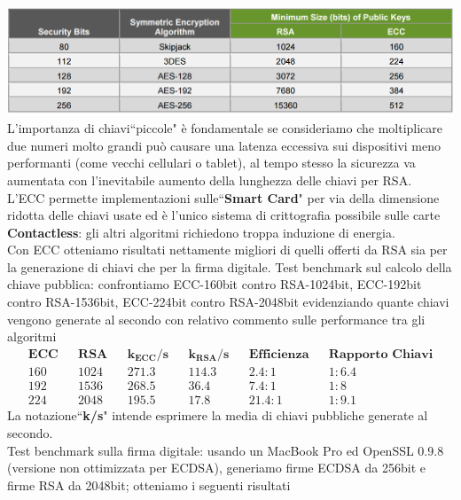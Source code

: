 \documentclass[a4paper,12pt]{tesiinfo}
\begin{document}
\includegraphics[scale=0.45]{RSAvECC_table}
\\
L'importanza di chiavi``piccole" \`e fondamentale se consideriamo che moltiplicare due numeri molto grandi pu\`o causare una latenza eccessiva sui dispositivi meno performanti (come vecchi cellulari o tablet), al tempo stesso la sicurezza va aumentata con l'inevitabile aumento della lunghezza delle chiavi per RSA.
\\
L'ECC permette implementazioni sulle``\textbf{Smart Card}" per via della dimensione ridotta delle chiavi usate ed \`e l'unico sistema di crittografia possibile sulle carte \textbf{Contactless}: gli altri algoritmi richiedono troppa induzione di energia.
\\
Con ECC otteniamo risultati nettamente migliori di quelli offerti da RSA sia per la generazione di chiavi che per la firma digitale. 
Test benchmark sul calcolo della chiave pubblica: confrontiamo ECC-160bit contro RSA-1024bit, ECC-192bit contro RSA-1536bit, ECC-224bit contro RSA-2048bit evidenziando quante chiavi vengono generate al secondo con relativo commento sulle performance tra gli algoritmi 
\begin{align*}
  &\textbf{ECC}& &\textbf{RSA}& &\textbf{$\mathbold{k_{ECC}}$/s}& &\textbf{$\mathbold{k_{RSA}}$/s}& &\textbf{Efficienza}& &\textbf{Rapporto Chiavi}&\\
  &160& &1024& &271.3& &114.3& &2.4:1& &1:6.4&\\
  &192& &1536& &268.5& &36.4& &7.4:1& &1:8&\\
  &224& &2048& &195.5& &17.8& &21.4:1& &1:9.1&
\end{align*}
La notazione``\textbf{k/s}" intende esprimere la media di chiavi pubbliche generate al secondo.
\\
Test benchmark sulla firma digitale: usando un MacBook Pro ed OpenSSL 0.9.8 (versione non ottimizzata per ECDSA), generiamo firme ECDSA da 256bit e firme RSA da 2048bit; otteniamo i seguenti risultati
\end{document}
